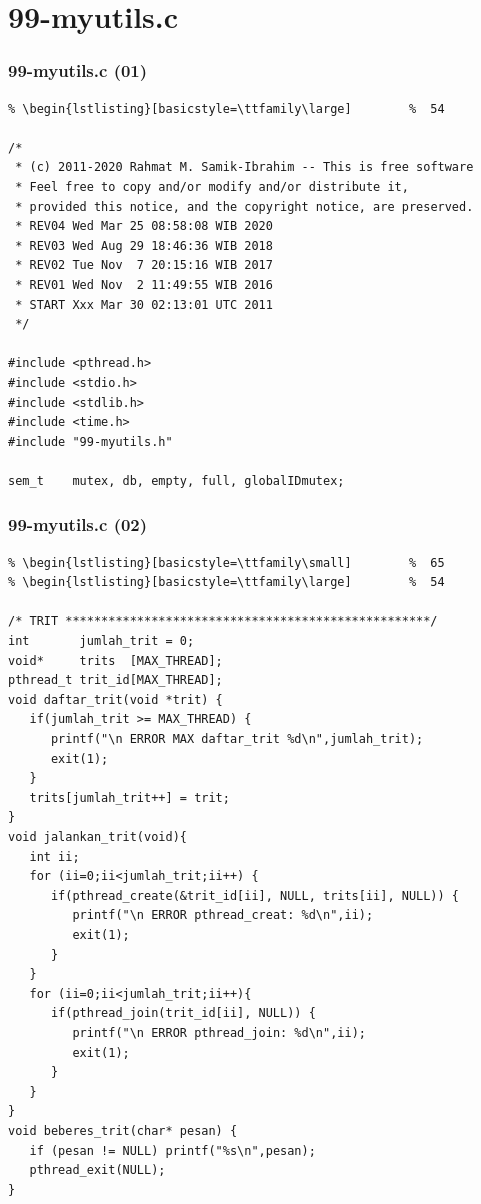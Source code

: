\documentclass[aspectratio=169, xcolor=table, notheorems, hyperref={pdfpagelabels=false}]{beamer}
\begin{document}
\section{99-myutils.c}
\begin{frame}[fragile]
\frametitle{99-myutils.c (01)}
\begin{lstlisting}[basicstyle=\ttfamily\footnotesize] %  72
% \begin{lstlisting}[basicstyle=\ttfamily\small]        %  65
% \begin{lstlisting}[basicstyle=\ttfamily\large]        %  54

/*
 * (c) 2011-2020 Rahmat M. Samik-Ibrahim -- This is free software
 * Feel free to copy and/or modify and/or distribute it, 
 * provided this notice, and the copyright notice, are preserved. 
 * REV04 Wed Mar 25 08:58:08 WIB 2020
 * REV03 Wed Aug 29 18:46:36 WIB 2018
 * REV02 Tue Nov  7 20:15:16 WIB 2017
 * REV01 Wed Nov  2 11:49:55 WIB 2016
 * START Xxx Mar 30 02:13:01 UTC 2011
 */

#include <pthread.h>
#include <stdio.h>
#include <stdlib.h>
#include <time.h>
#include "99-myutils.h"

sem_t    mutex, db, empty, full, globalIDmutex;

\end{lstlisting}
\end{frame}

\begin{frame}[fragile]
\frametitle{99-myutils.c (02)}
\begin{lstlisting}[basicstyle=\ttfamily\tiny]         % 108
% \begin{lstlisting}[basicstyle=\ttfamily\footnotesize] %  72
% \begin{lstlisting}[basicstyle=\ttfamily\small]        %  65
% \begin{lstlisting}[basicstyle=\ttfamily\large]        %  54

/* TRIT ***************************************************/
int       jumlah_trit = 0;
void*     trits  [MAX_THREAD];
pthread_t trit_id[MAX_THREAD];
void daftar_trit(void *trit) {
   if(jumlah_trit >= MAX_THREAD) {
      printf("\n ERROR MAX daftar_trit %d\n",jumlah_trit);
      exit(1);
   }
   trits[jumlah_trit++] = trit;
}
void jalankan_trit(void){
   int ii;
   for (ii=0;ii<jumlah_trit;ii++) {
      if(pthread_create(&trit_id[ii], NULL, trits[ii], NULL)) {
         printf("\n ERROR pthread_creat: %d\n",ii);
         exit(1);
      }
   }
   for (ii=0;ii<jumlah_trit;ii++){
      if(pthread_join(trit_id[ii], NULL)) {
         printf("\n ERROR pthread_join: %d\n",ii);
         exit(1);
      }
   }
}
void beberes_trit(char* pesan) {
   if (pesan != NULL) printf("%s\n",pesan);
   pthread_exit(NULL);
}

\end{lstlisting}
\end{frame}
\end{document}
